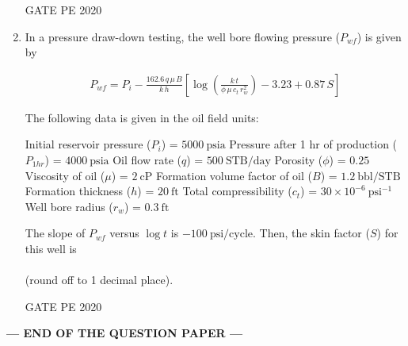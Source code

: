 \documentclass[journal,12pt,onecolumn]{IEEEtran}
\theoremstyle{remark}
\begin{document}
\begin{enumerate}
  \hfill{GATE PE 2020}
 
\item In a pressure draw-down testing, the well bore flowing pressure ($P_{wf}$) is given by  

\begin{align}
P_{wf} = P_{i} - \frac{162.6 \, q \, \mu \, B}{k \, h} \left[ \log \left( \frac{k \, t}{\phi \, \mu \, c_{t} \, r_{w}^{2}} \right) - 3.23 + 0.87 \, S \right]
\end{align}

The following data is given in the oil field units:  

Initial reservoir pressure ($P_{i}$) = $5000 \ \text{psia}$  
Pressure after 1 hr of production ($P_{1hr}$) = $4000 \ \text{psia}$  
Oil flow rate ($q$) = $500 \ \text{STB/day}$  
Porosity ($\phi$) = $0.25$  
Viscosity of oil ($\mu$) = $2 \ \text{cP}$  
Formation volume factor of oil ($B$) = $1.2 \ \text{bbl/STB}$  
Formation thickness ($h$) = $20 \ \text{ft}$  
Total compressibility ($c_{t}$) = $30 \times 10^{-6} \ \text{psi}^{-1}$  
Well bore radius ($r_{w}$) = $0.3 \ \text{ft}$  

The slope of $P_{wf}$ versus $\log t$ is $-100 \ \text{psi/cycle}$. Then, the skin factor ($S$) for this well is \\\\ (round off to 1 decimal place).  

  \hfill{GATE PE 2020}
\end{enumerate}
 
\begin{center}
\textbf{\large --- END OF THE QUESTION PAPER ---}
\end{center}
\end{document}
